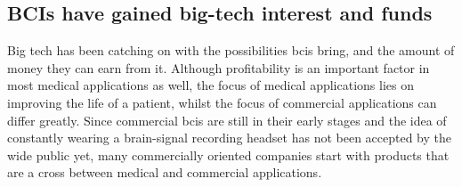 
\subsection{BCIs have gained big-tech interest and funds}
\label{subsec:bci_gaining_popularity_big_tech}

Big tech has been catching on with the possibilities \glspl{bci} bring, and the amount of money they can earn from it.
Although profitability is an important factor in most medical applications as well, the focus of medical applications lies on improving the life of a patient, whilst the focus of commercial applications can differ greatly.
Since commercial \glspl{bci} are still in their early stages and the idea of constantly wearing a brain-signal recording headset has not been accepted by the wide public yet, many commercially oriented companies start with products that are a cross between medical and commercial applications.

